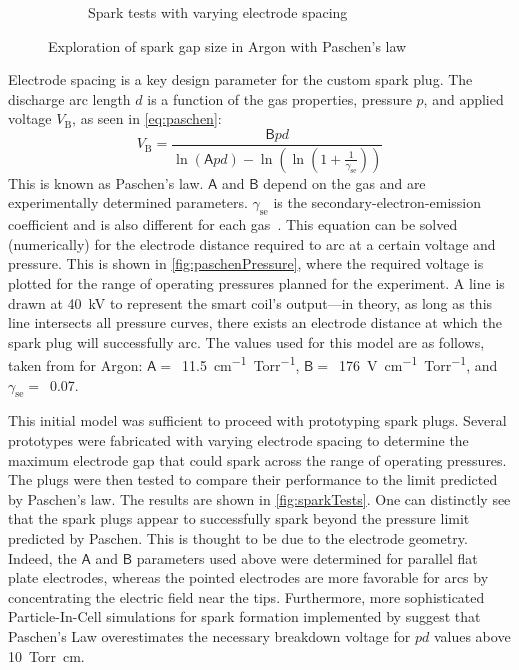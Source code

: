 \begin{figure}[h]
\begin{subfigure}[t]{0.47\textwidth}
                    \caption{Spark tests with varying electrode spacing}
                    \label{fig:sparkTests}
                \end{subfigure}
                \caption{Exploration of spark gap size in Argon with Paschen's law}
                \label{fig:sparking}
            \end{figure}

            Electrode spacing is a key design parameter for the custom spark plug. The discharge arc length $d$ is a function of the gas properties, pressure $p$, and applied voltage $V_\mathrm{B}$, as seen in \autoref{eq:paschen}:
            \begin{equation}
                V_\mathrm{B} = \frac{\mathsf{B} pd}{\ln{(\mathsf{A} pd)}-\ln{\left(\ln{\left(1+\frac{1}{\gamma_\mathrm{se}}\right)}\right)}}
                \label{eq:paschen}
            \end{equation}
            This is known as Paschen's law. $\mathsf{A}$ and $\mathsf{B}$ depend on the gas and are experimentally determined parameters. $\gamma_\mathrm{se}$ is the secondary-electron-emission coefficient and is also different for each gas~\cite{liebermanPrinciplesPlasmaDischarges2005}. This equation can be solved (numerically) for the electrode distance required to arc at a certain voltage and pressure. This is shown in \autoref{fig:paschenPressure}, where the required voltage is plotted for the range of operating pressures planned for the experiment. A line is drawn at \qty{40}{kV} to represent the smart coil's output---in theory, as long as this line intersects all pressure curves, there exists an electrode distance at which the spark plug will successfully arc. The values used for this model are as follows, taken from \textcite{liebermanPrinciplesPlasmaDischarges2005,theisComputingPaschenCurve2021} for Argon: $\mathsf{A} =$~\qty{11.5}{cm^{-1}.Torr^{-1}}, $\mathsf{B} =$~\qty{176}{V.cm^{-1}.Torr^{-1}}, and $\gamma_\mathrm{se} =$~0.07.

            This initial model was sufficient to proceed with prototyping spark plugs. Several prototypes were fabricated with varying electrode spacing to determine the maximum electrode gap that could spark across the range of operating pressures. The plugs were then tested to compare their performance to the limit predicted by Paschen's law. The results are shown in \autoref{fig:sparkTests}. One can distinctly see that the spark plugs appear to successfully spark beyond the pressure limit predicted by Paschen. This is thought to be due to the electrode geometry. Indeed, the $\mathsf{A}$ and $\mathsf{B}$ parameters used above were determined for parallel flat plate electrodes, whereas the pointed electrodes are more favorable for arcs by concentrating the electric field near the tips. Furthermore, more sophisticated Particle-In-Cell simulations for spark formation implemented by \textcite{theisComputingPaschenCurve2021} suggest that Paschen's Law overestimates the necessary breakdown voltage for $pd$ values above \qty{10}{Torr.cm}.

